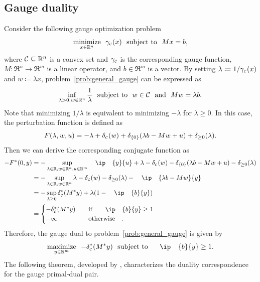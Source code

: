 \subsection{Gauge duality}
Consider the following gauge optimization problem 
\begin{equation} \label{prob:general_gauge} 
    \displaystyle\mathop{\hbox{\rm minimize}}_{x \in \mathbb{R}^n}\enspace \gamma_{\scriptscriptstyle\mathcal{C}}(x) \enspace\mathop{\hbox{\rm subject to}}\enspace Mx = b,
\end{equation}
where $\mathcal{C}\subseteq\mathbb{R}^n$ is a convex set and $\gamma_{\scriptscriptstyle\mathcal{C}}$ is the corresponding gauge function, $M:\Re^n\to\Re^m$ is a linear operator, and $b\in\Re^m$ is a vector. By setting 
$\lambda \coloneqq 1/\gamma_{\scriptscriptstyle\mathcal{C}}(x)$ and $w \coloneqq \lambda x$, problem~\eqref{prob:general_gauge} can be expressed as 
\begin{equation} \label{prob:general_gauge2} 
    \inf_{\lambda > 0, w \in \mathbb{R}^n} \frac{1}{\lambda} \enspace\mathop{\hbox{\rm subject to}}\enspace w \in \mathcal{C} \enspace\mathop{\hbox{\rm and}}\enspace Mw = \lambda b.
\end{equation}
Note that minimizing $1/\lambda$ is equivalent to minimizing $-\lambda$ for $\lambda \geq 0$. In this case, the perturbation function is defined as 
\begin{equation}
    F(\lambda, w, u) = -\lambda + \delta_{\scriptscriptstyle\mathcal{C}}(w) + \delta_{\{0\}}(\lambda b - Mw + u) + \delta_{\geq 0}(\lambda). 
\end{equation}
Then we can derive the corresponding conjugate function as
\begin{align*}
    -F^*(0, y) &= -\sup_{\lambda\in\Re, w\in\Re^n, u\in\Re^m} \ip{y}{u} + \lambda - \delta\Cs(w) - \delta_{\{0\}}(\lambda b - Mw + u) - \delta_{\geq 0}(\lambda)
    \\&= -\sup_{\lambda\in\Re, w\in\Re^n} \lambda - \delta\Cs(w) - \delta_{\geq 0}(\lambda) - \ip{\lambda b - Mw}{y}
    \\&= -\sup_{\lambda\geq 0} \delta\Cs^*(M^*y) + \lambda ( 1 - \ip{b}{y} )
    \\&= 
        \begin{cases}
            -\delta\Cs^*(M^*y) & \text{if} \ip{b}{y} \geq 1 \\
            -\infty & \text{otherwise}.
        \end{cases}
\end{align*}
Therefore, the gauge dual to problem~\eqref{prob:general_gauge} is given by
\begin{equation} \label{prob:general_gauge_dual}
    \maximize{y\in\Re^m} -\delta\Cs^*(M^*y) \st \ip{b}{y} \geq 1.
\end{equation}
The following theorem, developed by \citet{friedlander2014gauge}, characterizes the duality correspondence for the gauge primal-dual pair. 

